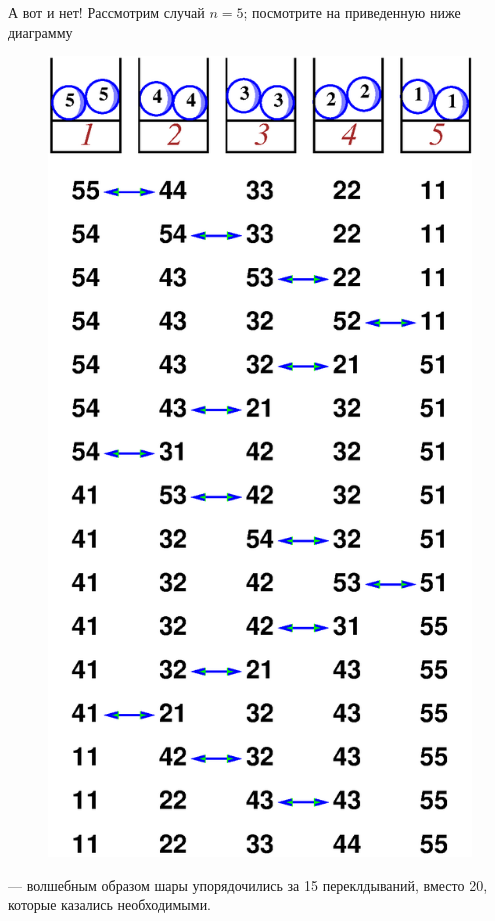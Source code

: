 А вот и нет!
Рассмотрим случай $n = 5$;
посмотрите на приведенную ниже диаграмму 
\begin{figure}[h!]
\centering
\includegraphics[scale=0.5]{Figs/UnsolvedPuzzles/5bin}
\end{figure}
--- волшебным образом шары упорядочились за 15 переклдываний, вместо 20, которые казались необходимыми.

